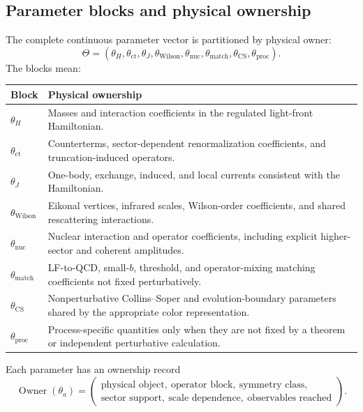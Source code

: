 \documentclass[11pt]{article}
\newcommand{\matchp}{\mathrm{match}}
\newcommand{\CS}{\ensuremath{\mathrm{CS}}}
\newcommand{\wil}{\mathrm{Wilson}}
\newcommand{\nuc}{\mathrm{nuc}}
\newcommand{\proc}{\mathrm{proc}}
\begin{document}
\subsection{Parameter blocks and physical ownership}

The complete continuous parameter vector is partitioned by physical owner:
\begin{equation}
 \Theta=
 \left(
 \theta_H,\theta_{\mathrm{ct}},
 \theta_J,\theta_{\wil},
 \theta_{\nuc},\theta_{\matchp},
 \theta_{\CS},\theta_{\proc}
 \right).
 \label{eq:parameter-blocks}
\end{equation}
The blocks mean:
\begin{longtable}{L{0.18\textwidth}L{0.71\textwidth}}
\toprule
Block & Physical ownership\\
\midrule
\endhead
\(\theta_H\) & Masses and interaction coefficients in the regulated
light-front Hamiltonian.\\
\(\theta_{\mathrm{ct}}\) & Counterterms, sector-dependent renormalization
coefficients, and truncation-induced operators.\\
\(\theta_J\) & One-body, exchange, induced, and local currents consistent
with the Hamiltonian.\\
\(\theta_{\wil}\) & Eikonal vertices, infrared scales, Wilson-order
coefficients, and shared rescattering interactions.\\
\(\theta_{\nuc}\) & Nuclear interaction and operator coefficients, including
explicit higher-sector and coherent amplitudes.\\
\(\theta_{\matchp}\) & LF-to-QCD, small-\(b\), threshold, and operator-mixing
matching coefficients not fixed perturbatively.\\
\(\theta_{\CS}\) & Nonperturbative Collins--Soper and evolution-boundary
parameters shared by the appropriate color representation.\\
\(\theta_{\proc}\) & Process-specific quantities only when they are not fixed
by a theorem or independent perturbative calculation.\\
\bottomrule
\end{longtable}

Each parameter has an ownership record
\begin{equation}
 \operatorname{Owner}(\theta_a)
 =
 \left(
 \begin{gathered}
 \text{physical object},\ \text{operator block},\ \text{symmetry class},\\
 \text{sector support},\ \text{scale dependence},\
 \text{observables reached}
 \end{gathered}
 \right).
 \label{eq:owner-record}
\end{equation}
\end{document}
